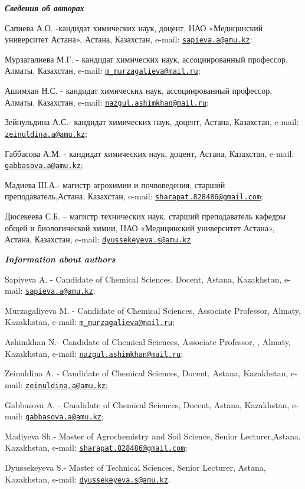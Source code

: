 \begin{authorinfo}
\hspace{1em}\emph{{\bfseries Сведения об авторах}}

Сапиева А.О. -кандидат химических наук, доцент, НАО «Медицинский
университет Астана», Астана, Казахстан, e-mail:
\href{mailto:sapieva.a@amu.kz}{\nolinkurl{sapieva.a@amu.kz}};

Мурзагалиева М.Г. - кандидат химических наук, ассоциированный профессор,
Алматы, Казахстан, e-mail:
\href{mailto:m_murzagalieva@mail.ru}{\nolinkurl{m\_murzagalieva@mail.ru}};

Ашимхан Н.С. - кандидат химических наук, ассоциированный профессор,
Алматы, Казахстан, e-mail:
\href{mailto:nazgul.ashimkhan@mail.ru}{\nolinkurl{nazgul.ashimkhan@mail.ru}};

Зейнульдина А.С.- кандидат химических наук, доцент, Астана, Казахстан,
e-mail:
\href{mailto:zeinuldina.a@amu.kz}{\nolinkurl{zeinuldina.a@amu.kz}};

Габбасова А.М. - кандидат химических наук, доцент, Астана, Казахстан,
e-mail:
\href{mailto:gabbasova.a@amu.kz}{\nolinkurl{gabbasova.a@amu.kz}};

Мадиева Ш.А.- магистр агрохимии и почвоведения, старший
преподаватель,Астана, Казахстан, e-mail:
\href{mailto:sharapat.828486@gmail.com}{\nolinkurl{sharapat.828486@gmail.com}};

Дюсекеева С.Б. -- магистр технических наук, старший преподаватель
кафедры общей и биологической химии, НАО «Медицинский университет
Астана», Астана, Казахстан, e-mail:
\href{mailto:dyussekeyeva.s@amu.kz}{\nolinkurl{dyussekeyeva.s@amu.kz}}.

\hspace{1em}\emph{{\bfseries Information about authors}}

Sapiyeva A. - Candidate of Chemical Sciences, Docent, Astana,
Kazakhstan, e-mail:
\href{mailto:sapieva.a@amu.kz}{\nolinkurl{sapieva.a@amu.kz}};

Murzagaliyeva M. - Candidate of Chemical Sciences, Associate Professor,
Almaty, Kazakhstan, e-mail:
\href{mailto:m_murzagalieva@mail.ru}{\nolinkurl{m\_murzagalieva@mail.ru}};

Ashimkhan N.- Candidate of Chemical Sciences, Associate Professor, ,
Almaty, Kazakhstan, e-mail:
\href{mailto:nazgul.ashimkhan@mail.ru}{\nolinkurl{nazgul.ashimkhan@mail.ru}};

Zeinuldina A. - Candidate of Chemical Sciences, Docent, Astana,
Kazakhstan, e-mail:
\href{mailto:zeinuldina.a@amu.kz}{\nolinkurl{zeinuldina.a@amu.kz}};

Gabbasova A. - Candidate of Chemical Sciences, Docent, Astana,
Kazakhstan, e-mail:
\href{mailto:gabbasova.a@amu.kz}{\nolinkurl{gabbasova.a@amu.kz}};

Madiyeva Sh.- Master of Agrochemistry and Soil Science, Senior
Lecturer,Astana, Kazakhstan, e-mail:
\href{mailto:sharapat.828486@gmail.com}{\nolinkurl{sharapat.828486@gmail.com}};

Dyussekeyeva S.- Master of Technical Sciences, Senior Lecturer, Astana,
Kazakhstan, e-mail:
\href{mailto:dyussekeyeva.s@amu.kz}{\nolinkurl{dyussekeyeva.s@amu.kz}}.
\end{authorinfo}
